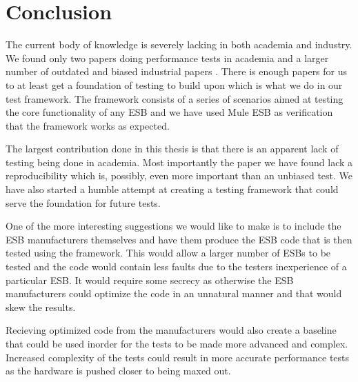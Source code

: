 \section{Conclusion}

The current body of knowledge is severely lacking in both academia and industry. We found only two papers \cite{Sanjay2011,Garcia2010} doing performance tests in academia and a larger number of outdated and biased industrial papers \cite{Perera07,Perera07R2,Perera07R3,mulesoft08}.
There is enough papers for us to at least get a foundation of testing to build upon which is what we do in our test framework. The framework consists of a series of scenarios aimed at testing the core functionality of any ESB and we have used Mule ESB as verification that the framework works as expected. 

The largest contribution done in this thesis is that there is an apparent lack of testing being done in academia. 
Most importantly the paper we have found \cite{Sanjay2011} lack a reproducibility which is, possibly, even more important than an unbiased test. 
We have also started a humble attempt at creating a testing framework that could serve the foundation for future tests. 

One of the more interesting suggestions we would like to make is to include the ESB manufacturers themselves and have them produce the ESB code that is then tested using the framework. 
This would allow a larger number of ESBs to be tested and the code would contain less faults due to the testers inexperience of a particular ESB. 
It would require some secrecy as otherwise the ESB manufacturers could optimize the code in an unnatural manner and that would skew the results.

Recieving optimized code from the manufacturers would also create a baseline that could be used inorder for the tests to be made more advanced and complex.
Increased complexity of the tests could result in more accurate performance tests as the hardware is pushed closer to being maxed out.
